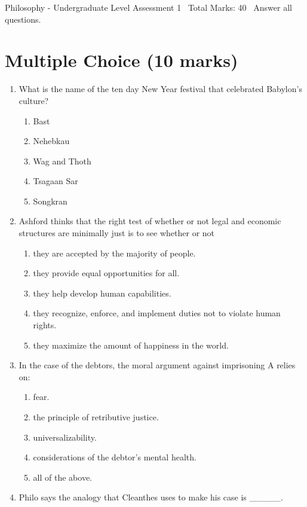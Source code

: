 \documentclass[12pt]{article}
\begin{document}
\begin{center}
Philosophy - Undergraduate Level Assessment 1 \
Total Marks: 40 \
Answer all questions.
\end{center}

\section*{Multiple Choice (10 marks)}
\begin{enumerate}[label=\arabic*.]
\item What is the name of the ten day New Year festival that celebrated Babylon's culture?
\begin{enumerate}[label=(\alph*)]
    \item Bast
    \item Nehebkau
    \item Wag and Thoth
    \item Tsagaan Sar
    \item Songkran
\end{enumerate}
\item Ashford thinks that the right test of whether or not legal and economic structures are
minimally just is to see whether or not
\begin{enumerate}[label=(\alph*)]
    \item they are accepted by the majority of people.
    \item they provide equal opportunities for all.
    \item they help develop human capabilities.
    \item they recognize, enforce, and implement duties not to violate human rights.
    \item they maximize the amount of happiness in the world.
\end{enumerate}
\item In the case of the debtors, the moral argument against imprisoning A relies on:
\begin{enumerate}[label=(\alph*)]
    \item fear.
    \item the principle of retributive justice.
    \item universalizability.
    \item considerations of the debtor's mental health.
    \item all of the above.
\end{enumerate}
\item Philo says the analogy that Cleanthes uses to make his case is \_\_\_\_\_.

\end{enumerate}
\end{document}
